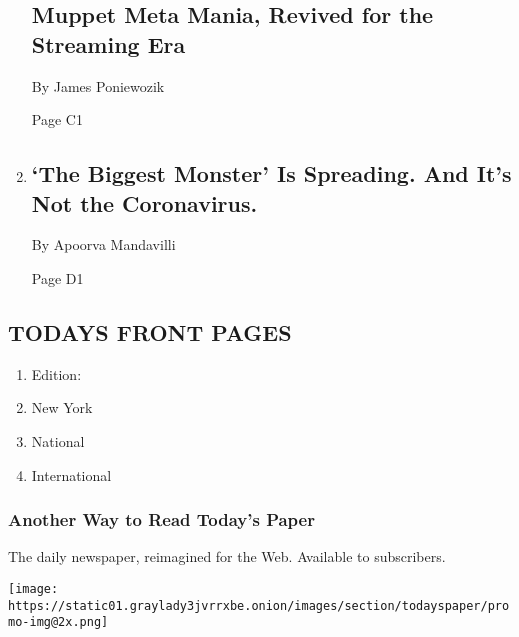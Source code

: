 \begin{enumerate}
  \hypertarget{muppet-meta-mania-revived-for-the-streaming-era}{%
  \subsection{Muppet Meta Mania, Revived for the Streaming
  Era}\label{muppet-meta-mania-revived-for-the-streaming-era}}

  By James Poniewozik

  Page C1
\item
  \href{/2020/08/03/health/coronavirus-tuberculosis-aids-malaria.html}{}

  \hypertarget{the-biggest-monster-is-spreading-and-its-not-the-coronavirus}{%
  \subsection{`The Biggest Monster' Is Spreading. And It's Not the
  Coronavirus.}\label{the-biggest-monster-is-spreading-and-its-not-the-coronavirus}}

  By Apoorva Mandavilli

  Page D1
\end{enumerate}

\hypertarget{todays-front-pages}{%
\subsection{TODAYS FRONT PAGES}\label{todays-front-pages}}

\begin{enumerate}
\def\labelenumi{\arabic{enumi}.}
\tightlist
\item
  Edition:
\item
  New York
\item
  National
\item
  International
\end{enumerate}

\href{http://app.nytimes3xbfgragh.onion/todayspaper}{}

\hypertarget{another-way-to-read-todays-paper}{%
\subsubsection{Another Way to Read Today's
Paper}\label{another-way-to-read-todays-paper}}

The daily newspaper, reimagined for the Web. Available to subscribers.

\texttt{[image: https://static01.graylady3jvrrxbe.onion/images/section/todayspaper/promo-img@2x.png]}

